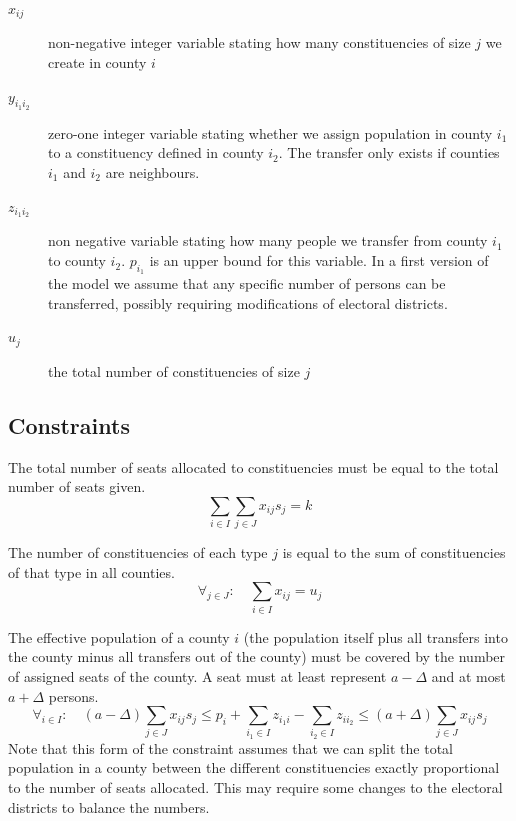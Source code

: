 \documentclass[runningheads]{llncs}
\begin{document}
\begin{description}
\item[$x_{ij}$] non-negative integer variable stating how many constituencies of size $j$ we create in county $i$
\item[$y_{i_1i_2}$] zero-one integer variable stating whether we assign population in county $i_{1}$ to a constituency defined in county $i_{2}$. The transfer only exists if counties $i_{1}$ and $i_{2}$ are neighbours.
\item[$z_{i_1i_2}$] non negative variable stating how many people we transfer from county $i_{1}$ to county $i_{2}$. $p_{i_1}$ is an upper bound for this variable. In a first version of the model we assume that any specific number of persons can be transferred, possibly requiring modifications of electoral districts. 
\item[$u_{j}$] the total number of constituencies of size $j$
\end{description}

\subsection{Constraints}

The total number of seats allocated to constituencies must be equal to the total number of seats given.
\begin{equation}
\sum_{i \in I} \sum_{j \in J} x_{ij}s_{j} = k
\end{equation}

The number of constituencies of each type $j$ is equal to the sum of constituencies of that type in all counties.
\begin{equation}
\forall_{j \in J}:\quad \sum_{i \in I} x_{ij} = u_{j}
\end{equation}

The effective population of a county $i$ (the population itself plus all transfers into the county minus all transfers out of the county) must be covered by the number of assigned seats of the county. A seat must at least represent $a-\Delta$ and at most $a+\Delta$ persons.
\begin{equation}
\forall_{i \in I}:\quad (a-\Delta)\sum_{j \in J} x_{ij}s_{j} \leq p_{i}+\sum_{i_1 \in I} z_{i_1i} - \sum_{i_2 \in I} z_{ii_2}\leq (a+\Delta)\sum_{j \in J} x_{ij}s_{j}
\end{equation}
Note that this form of the constraint assumes that we can split the total population in a county between the different constituencies exactly proportional to the number of seats allocated. This may require some changes to the electoral districts to balance the numbers.
\end{document}
